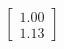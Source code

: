 \documentclass[preview]{standalone}
\begin{document}
\begin{align*}
\begin{bmatrix} 1.00 \\ 1.13 \end{bmatrix}
\end{align*}
\end{document}
